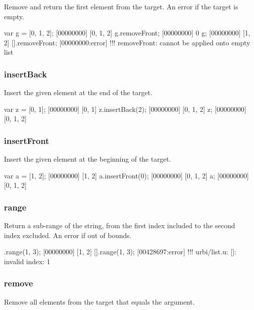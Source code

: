Remove and return the first element from the target. An error if the
target is empty.

\begin{urbiscript}[firstnumber=last]
var g = [0, 1, 2];
[00000000] [0, 1, 2]
g.removeFront;
[00000000] 0
g;
[00000000] [1, 2]
[].removeFront;
[00000000:error] !!! removeFront: cannot be applied onto empty list
\end{urbiscript}

\subsubsection{insertBack}
\label{sec:std-list-pushback}

Insert the given element at the end of the target.

\begin{urbiscript}[firstnumber=last]
var z = [0, 1];
[00000000] [0, 1]
z.insertBack(2);
[00000000] [0, 1, 2]
z;
[00000000] [0, 1, 2]
\end{urbiscript}

\subsubsection{insertFront}

Insert the given element at the beginning of the target.

\begin{urbiscript}[firstnumber=last]
var a = [1, 2];
[00000000] [1, 2]
a.insertFront(0);
[00000000] [0, 1, 2]
a;
[00000000] [0, 1, 2]
\end{urbiscript}

\subsubsection{range}

Return a sub-range of the string, from the first index included to the
second index excluded. An error if out of bounds.

\begin{urbiscript}[firstnumber=last]
[0, 1, 2, 3].range(1, 3);
[00000000] [1, 2]
[].range(1, 3);
[00428697:error] !!! urbi/list.u: []: invalid index: 1
\end{urbiscript}


\subsubsection{remove}

Remove all elements from the target that equals the argument.

